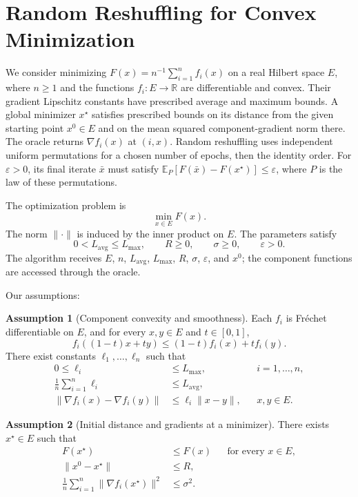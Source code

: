 \documentclass[10pt]{article}
\theoremstyle{definition}
\newtheorem{assumption}{Assumption}
\begin{document}
\section*{Random Reshuffling for Convex Minimization}
We consider minimizing $F(x)=n^{-1}\sum_{i=1}^n f_i(x)$ on a real Hilbert space $E$, where $n\geq1$ and the functions $f_i:E\to\mathbb{R}$ are differentiable and convex. Their gradient Lipschitz constants have prescribed average and maximum bounds. A global minimizer $x^\star$ satisfies prescribed bounds on its distance from the given starting point $x^0\in E$ and on the mean squared component-gradient norm there. The oracle returns $\nabla f_i(x)$ at $(i,x)$. Random reshuffling uses independent uniform permutations for a chosen number of epochs, then the identity order. For $\varepsilon>0$, its final iterate $\bar{x}$ must satisfy $\mathbb{E}_{P}[F(\bar{x})-F(x^\star)]\leq\varepsilon$, where $P$ is the law of these permutations.

The optimization problem is
\[
\min_{x\in E} F(x).
\]
The norm $\|\cdot\|$ is induced by the inner product on $E$. The parameters satisfy
\[
0<L_{\mathrm{avg}}\leq L_{\max},\qquad
R\geq0,\qquad \sigma\geq0,\qquad \varepsilon>0.
\]
The algorithm receives $E$, $n$, $L_{\mathrm{avg}}$, $L_{\max}$, $R$, $\sigma$, $\varepsilon$, and $x^0$; the component functions are accessed through the oracle.

Our assumptions:
\begin{assumption}[Component convexity and smoothness]
Each $f_i$ is Fr\'echet differentiable on $E$, and for every $x,y\in E$ and $t\in[0,1]$,
\[
f_i((1-t)x+ty)\leq(1-t)f_i(x)+t f_i(y).
\]
There exist constants $\ell_1,\ldots,\ell_n$ such that
\[
\begin{aligned}
0\leq\ell_i&\leq L_{\max}, &&i=1,\ldots,n,\\
\frac1n\sum_{i=1}^n\ell_i&\leq L_{\mathrm{avg}},\\
\|\nabla f_i(x)-\nabla f_i(y)\|&\leq\ell_i\|x-y\|,
&&x,y\in E.
\end{aligned}
\]
\end{assumption}

\begin{assumption}[Initial distance and gradients at a minimizer]
There exists $x^\star\in E$ such that
\[
\begin{aligned}
F(x^\star)&\leq F(x) &&\text{for every }x\in E,\\
\|x^0-x^\star\|&\leq R,\\
\frac1n\sum_{i=1}^n\|\nabla f_i(x^\star)\|^2&\leq\sigma^2.
\end{aligned}
\]
\end{assumption}
\end{document}
